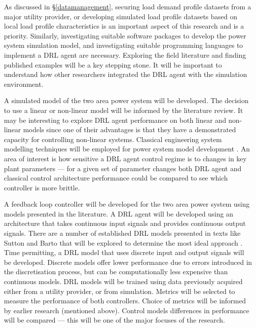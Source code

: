 As discussed in \S{}\ref{datamanagement}, securing load demand profile datasets from a major utility provider, or developing simulated load profile datasets based on local load profile characteristics is an important aspect of this research and is a priority. Similarly, investigating suitable software packages to develop the power system simulation model, and investigating suitable programming languages to implement a DRL agent are necessary. Exploring the field literature and finding published examples will be a key stepping stone. It will be important to understand how other researchers integrated the DRL agent with the simulation environment.

A simulated model of the two area power system will be developed. The decision to use a linear or non-linear model will be informed by the literature review. It may be interesting to explore DRL agent performance on both linear and non-linear models since one of their advantages is that they have a demonstrated capacity for controlling non-linear systems. Classical engineering system modelling techniques will be employed for power system model development \cite{Ogat2010}. An area of interest is how sensitive a DRL agent control regime is to changes in key plant parameters --- for a given set of parameter changes both DRL agent and classical control architecture performance could be compared to see which controller is more brittle.

A feedback loop controller will be developed for the two area power system using models presented in the literature. A DRL agent will be developed using an architecture that takes continuous input signals and provides continuous output signals. There are a number of established DRL models presented in texts like Sutton and Barto that will be explored to determine the most ideal approach \cite{Sutton2018}. Time permitting, a DRL model that uses discrete input and output signals will be developed. Discrete models offer lower performance due to errors introduced in the discretisation process, but can be computationally less expensive than continuous models. DRL models will be trained using data previously acquired either from a utility provider, or from simulation. Metrics will be selected to measure the performance of both controllers. Choice of metrics will be informed by earlier research (mentioned above). Control models differences in performance will be compared --- this will be one of the major focuses of the research.

